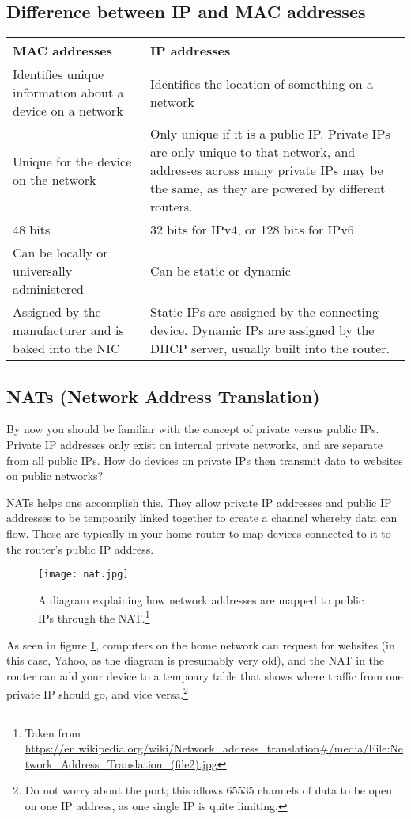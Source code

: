 \documentclass[../main.tex]{subfiles}
\begin{document}
\subsection{Difference between IP and MAC addresses}

\begin{longtable}{|p{}|p{}|}
    \hline 
    \textbf{MAC addresses} & \textbf{IP addresses}
    \\ \hline
    Identifies unique information about a device on a network & Identifies the location of something on a network
    \\ \hline
    Unique for the device on the network & Only unique if it is a public IP. Private IPs are only unique to that network, and addresses across many private IPs may be the same, as they are powered by different routers.
    \\ \hline
    48 bits & 32 bits for IPv4, or 128 bits for IPv6
    \\ \hline
    Can be locally or universally administered & Can be static or dynamic
    \\ \hline
    Assigned by the manufacturer and is baked into the NIC & Static IPs are assigned by the connecting device. Dynamic IPs are assigned by the DHCP server, usually built into the router.
    \\ \hline
\end{longtable}

\subsection{NATs (Network Address Translation)}
\label{2:sec:nats}

By now you should be familiar with the concept of private versus public IPs. Private IP addresses only exist on internal private networks, and are separate from all public IPs. How do devices on private IPs then transmit data to websites on public networks?

NATs helps one accomplish this. They allow private IP addresses and public IP addresses to be tempoarily linked together to create a channel whereby data can flow. These are typically in your home router to map devices connected to it to the router's public IP address.

\begin{figure}[h]
    \centering
    \texttt{[image: nat.jpg]}
    \caption{A diagram explaining how network addresses are mapped to public IPs through the NAT.\footnote{Taken from \url{https://en.wikipedia.org/wiki/Network_address_translation#/media/File:Network_Address_Translation_(file2).jpg}}}
    \label{fig:nat}
\end{figure}

As seen in figure \ref{fig:nat}, computers on the home network can request for websites (in this case, Yahoo, as the diagram is presumably very old), and the NAT in the router can add your device to a tempoary table that shows where traffic from one private IP should go, and vice versa.\footnote{Do not worry about the port; this allows 65535 channels of data to be open on one IP address, as one single IP is quite limiting.}
\end{document}
